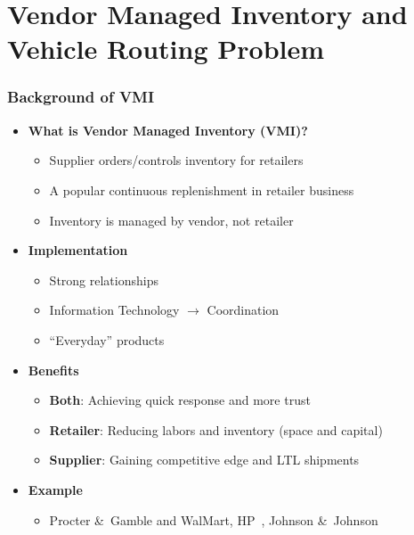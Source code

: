 \documentclass[10pt,handout,notes=show]{beamer}
\begin{document}
\section[VMI/VRP]{Vendor Managed Inventory and Vehicle Routing Problem}
  \begin{frame}
  \frametitle{Background of VMI}

  \begin{itemize}
    \item<1-> \textbf{What is Vendor Managed Inventory (VMI)?}
    \begin{itemize}
      \item<2-> Supplier orders/controls inventory for retailers
      \item<2-> A popular \alert{continuous replenishment} in retailer business
      \item<2-> Inventory is managed by vendor, not retailer \NextLine
    \end{itemize}
    \item<1-> \textbf{Implementation}
    \begin{itemize}
      \item<3-> \alert{Strong relationships}
      \item<3-> Information Technology $\rightarrow$ Coordination
      \item<3-> \alert{``Everyday'' products} \NextLine
    \end{itemize}
    \item<1-> \textbf{Benefits}
    \begin{itemize}
      \item<4-> \textbf{Both}: Achieving \alert{quick response} and more trust
      \item<4-> \textbf{Retailer}: Reducing labors and \alert{inventory} (space and capital)
      \item<4-> \textbf{Supplier}: Gaining competitive edge and LTL shipments \NextLine
    \end{itemize}
    \item<1-> \textbf{Example}
    \begin{itemize}
      \item<4-> Procter \&\ Gamble and WalMart, HP~, Johnson \&\ Johnson
    \end{itemize}
  \end{itemize}


\end{frame}
\end{document}
